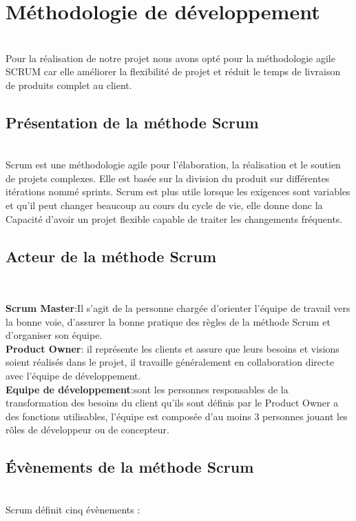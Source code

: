 {\section{Méthodologie de développement}
\texttt{}\\[0.5cm]
\textsf{\LARGE Pour la réalisation de notre projet nous avons opté pour la méthodologie agile SCRUM car elle améliorer la flexibilité de projet et réduit le temps de livraison de produits complet au client.
}
\subsection{\Large  Présentation de la méthode Scrum}
\texttt{}\\[0.5cm]
\textsf{\LARGE Scrum est une méthodologie agile pour l'élaboration, la réalisation et le soutien de projets complexes. Elle est basée sur la division du produit sur différentes itérations nommé sprints. Scrum est plus utile lorsque les exigences sont variables et qu’il peut changer beaucoup au cours du cycle de vie, elle donne donc la Capacité d'avoir un projet flexible capable de traiter les changements fréquents.
}
\subsection{\Large    Acteur de la méthode Scrum}
\texttt{}\\[0.5cm]

\par \noindent \textbf{\Large Scrum Master}:\textsf{\LARGE Il s'agit de la personne chargée d'orienter l'équipe de travail vers la bonne voie, d'assurer la bonne pratique des règles de la méthode Scrum et d'organiser son équipe.} \\[0.1cm]

\noindent \textbf{\Large Product Owner}: \textsf{\LARGE il représente les clients et assure que leurs besoins et visions soient réalisés dans le projet, il travaille généralement en collaboration directe avec l’équipe de développement. }\\[0.1cm]

\noindent \textbf{\Large Equipe de développement}:\textsf{\LARGE sont les personnes responsables de la transformation des besoins du client qu'ils sont définis par le Product Owner a des fonctions utilisables, l'équipe est composée d'au moins 3 personnes jouant les rôles de développeur ou de concepteur.}\\[0.1cm]
\subsection{\Large Évènements de la méthode Scrum }
 \texttt{}\\[0.1cm]
\textsf{ \LARGE Scrum définit cinq évènements : }
\\[0.1cm]

}
